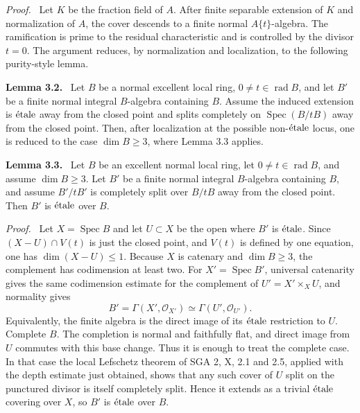\documentclass[12pt]{article}
\newcommand{\Oo}{\mathcal{O}}
\newcommand{\Spec}{\operatorname{Spec}}
\newcommand{\etale}{\ifmmode\textnormal{\'etale}\else\'etale\fi}
\newenvironment{statement}[1]{\par\medskip\noindent\textbf{#1.}\ }{\par\medskip}
\newenvironment{prooftext}[1][Proof]{\par\noindent\emph{#1.}\ }{\par\medskip}
\begin{document}
\begin{prooftext}
Let \(K\) be the fraction field of \(A\). After finite separable extension of \(K\) and normalization of \(A\), the cover descends to a finite normal \(A\{t\}\)-algebra. The ramification is prime to the residual characteristic and is controlled by the divisor \(t=0\). The argument reduces, by normalization and localization, to the following purity-style lemma.
\end{prooftext}

\begin{statement}{Lemma 3.2}
Let \(B\) be a normal excellent local ring, \(0\ne t\in\operatorname{rad}B\), and let \(B'\) be a finite normal integral \(B\)-algebra containing \(B\). Assume the induced extension is \(\etale\) away from the closed point and splits completely on \(\Spec(B/tB)\) away from the closed point. Then, after localization at the possible non-\(\etale\) locus, one is reduced to the case \(\dim B\ge3\), where Lemma 3.3 applies.
\end{statement}

\begin{statement}{Lemma 3.3}
Let \(B\) be an excellent normal local ring, let \(0\ne t\in\operatorname{rad}B\), and assume \(\dim B\ge3\). Let \(B'\) be a finite normal integral \(B\)-algebra containing \(B\), and assume \(B'/tB'\) is completely split over \(B/tB\) away from the closed point. Then \(B'\) is \(\etale\) over \(B\).
\end{statement}

\begin{prooftext}
Let \(X=\Spec B\) and let \(U\subset X\) be the open where \(B'\) is \(\etale\). Since \((X-U)\cap V(t)\) is just the closed point, and \(V(t)\) is defined by one equation, one has \(\dim(X-U)\le1\). Because \(X\) is catenary and \(\dim B\ge3\), the complement has codimension at least two. For \(X'=\Spec B'\), universal catenarity gives the same codimension estimate for the complement of \(U'=X'\times_XU\), and normality gives
\[
B'=\Gamma(X',\Oo_{X'})\simeq\Gamma(U',\Oo_{U'}).
\]
Equivalently, the finite algebra is the direct image of its \(\etale\) restriction to \(U\). Complete \(B\). The completion is normal and faithfully flat, and direct image from \(U\) commutes with this base change. Thus it is enough to treat the complete case. In that case the local Lefschetz theorem of SGA 2, X, 2.1 and 2.5, applied with the depth estimate just obtained, shows that any such cover of \(U\) split on the punctured divisor is itself completely split. Hence it extends as a trivial \(\etale\) covering over \(X\), so \(B'\) is \(\etale\) over \(B\).
\end{prooftext}
\end{document}
